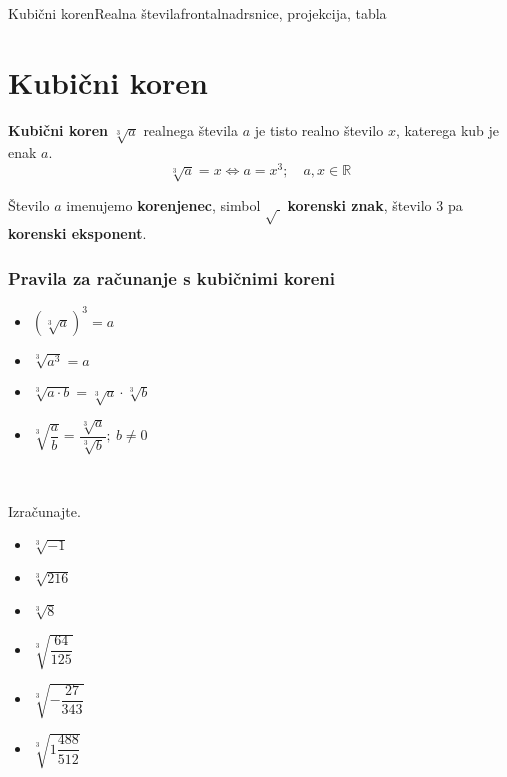 \begin{priprava}{5}{}{Kubični koren}{Realna števila}{frontalna}{drsnice, projekcija, tabla}
    
    \section{Kubični koren}

        

            
                \textbf{Kubični koren} $\sqrt[3]{a}$ realnega števila $a$ je tisto realno število $x$,
                katerega kub je enak $a$.
                $$\sqrt[3]{a}=x \Leftrightarrow a=x^3; \quad a,x\in\mathbb{R}$$

                Število $a$ imenujemo \textbf{korenjenec}, simbol $\sqrt{~}$ \textbf{korenski znak}, število $3$ pa \textbf{korenski eksponent}.
            

            \subsubsection*{Pravila za računanje s kubičnimi koreni}
                
                    \begin{itemize}
                        \item $\left(\sqrt[3]{a}\right)^3=a$
                        \item $\sqrt[3]{a^3}=a$
                        \item $\sqrt[3]{a\cdot b}=\sqrt[3]{a}\cdot\sqrt[3]{b}$
                        \item $\sqrt[3]{\dfrac{a}{b}}=\dfrac{\sqrt[3]{a}}{\sqrt[3]{b}}; ~b\neq 0$
                    \end{itemize}
                
            

                    ~~~\\


        
            \begin{naloga}
                Izračunajte.
                \begin{itemize}
                    
                        \item $\sqrt[3]{-1}$ 
                        \item $\sqrt[3]{216}$ 
                        \item $\sqrt[3]{8}$ 
                        \item $\sqrt[3]{\dfrac{64}{125}}$ 
                        \item $\sqrt[3]{-\dfrac{27}{343}}$ 
                        \item $\sqrt[3]{1\dfrac{488}{512}}$ 
                    


\end{itemize}
\end{naloga}
\end{priprava}
